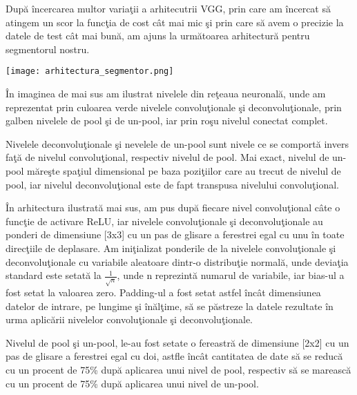 Dup\u{a} \^{i}ncercarea multor varia\c{t}ii a arhitecutrii VGG, prin care am \^{i}ncercat s\u{a} atingem un scor la func\c{t}ia de cost c\^{a}t mai mic \c{s}i prin care s\u{a} avem o precizie la datele de test c\^{a}t mai bun\u{a}, am ajuns la urm\u{a}toarea arhitectur\u{a} pentru segmentorul nostru.

\begin{center}
\texttt{[image: arhitectura\_segmentor.png]}
\end{center}

\^{I}n imaginea de mai sus am ilustrat nivelele din re\c{t}eaua neuronal\u{a}, unde am reprezentat prin culoarea verde nivelele convolu\c{t}ionale \c{s}i deconvolu\c{t}ionale, prin galben nivelele de pool \c{s}i de un-pool, iar prin ro\c{s}u nivelul conectat complet.

\par

Nivelele deconvolu\c{t}ionale \c{s}i nevelele de un-pool sunt nivele ce se comport\u{a} invers fa\c{t}\u{a} de nivelul convolu\c{t}ional, respectiv nivelul de pool. Mai exact, nivelul de un-pool m\u{a}re\c{s}te spa\c{t}iul dimensional pe baza pozi\c{t}iilor care au trecut de nivelul de pool, iar nivelul deconvolu\c{t}ional este de fapt transpusa nivelului convolu\c{t}ional.

\par

\^{I}n arhitectura ilustrat\u{a} mai sus, am pus dup\u{a} fiecare nivel convolu\c{t}ional c\^{a}te o func\c{t}ie de activare ReLU, iar nivelele convolu\c{t}ionale \c{s}i deconvolu\c{t}ionale au ponderi de dimensiune [3x3] cu un pas de glisare a ferestrei egal cu unu \^{i}n toate direc\c{t}iile de deplasare. Am ini\c{t}ializat ponderile de la nivelele convolu\c{t}ionale \c{s}i deconvolu\c{t}ionale cu variabile aleatoare dintr-o distribu\c{t}ie normal\u{a}, unde devia\c{t}ia standard este setat\u{a} la $\frac{1}{\sqrt{n}}$, unde n reprezint\u{a} numarul de variabile, iar bias-ul a fost setat la valoarea zero. Padding-ul a fost setat astfel \^{i}nc\^{a}t dimensiunea datelor de intrare, pe lungime \c{s}i \^{i}n\u{a}l\c{t}ime, s\u{a} se p\u{a}streze la datele rezultate \^{i}n urma aplic\u{a}rii nivelelor convolu\c{t}ionale \c{s}i deconvolu\c{t}ionale.

\par

Nivelul de pool \c{s}i un-pool, le-au fost setate o fereastr\u{a} de dimensiune [2x2] cu un pas de glisare a ferestrei egal cu doi, astfle \^{i}nc\^{a}t cantitatea de date s\u{a} se reduc\u{a} cu un procent de 75\% dup\u{a} aplicarea unui nivel de pool, respectiv s\u{a} se mareasc\u{a} cu un procent de 75\% dup\u{a} aplicarea unui nivel de un-pool.

